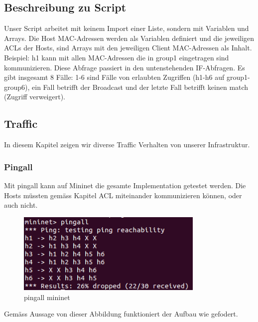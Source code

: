\documentclass[a4,12pt]{scrartcl}
\begin{document}
\subsection{Beschreibung zu Script}
Unser Script arbeitet mit keinem Import einer Liste, sondern mit Variablen und Arrays. Die Host MAC-Adressen werden als Variablen definiert und die jeweiligen ACLs der Hosts, sind Arrays mit den jeweiligen Client MAC-Adressen als Inhalt. Beispiel: h1 kann mit allen MAC-Adressen die in group1 eingetragen sind kommunizieren. Diese Abfrage passiert in den untenstehenden IF-Abfragen. Es gibt insgesamt 8 Fälle: 1-6 sind Fälle von erlaubten Zugriffen (h1-h6 auf group1-group6), ein Fall betrifft der Broadcast und der letzte Fall betrifft keinen match (Zugriff verweigert). 

\subsection{Traffic}
In diesem Kapitel zeigen wir diverse Traffic Verhalten von unserer Infrastruktur. 

\subsubsection{Pingall}
Mit pingall kann auf Mininet die gesamte Implementation getestet werden. Die Hosts müssten gemäss Kapitel ACL miteinander kommunizieren können, oder auch nicht. 
\begin{figure} [H]
	\begin{center}
	\includegraphics[width=0.80\textwidth]{./pictures/pingall.png}
	\caption{pingall mininet}
	\label{x}
	\end{center}
\end{figure} 
Gemäss Aussage von dieser Abbildung funktioniert der Aufbau wie gefodert. 
\end{document}
